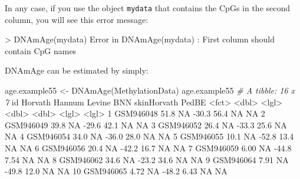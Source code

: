 \documentclass[]{article}
\newcommand{\hlnum}[1]{\textcolor[rgb]{0.816,0.125,0.439}{#1}}%
\newcommand{\hlstr}[1]{\textcolor[rgb]{0.251,0.627,0.251}{#1}}%
\newcommand{\hlcom}[1]{\textcolor[rgb]{0.502,0.502,0.502}{\textit{#1}}}%
\newcommand{\hlopt}[1]{\textcolor[rgb]{0,0,0}{#1}}%
\newcommand{\hlstd}[1]{\textcolor[rgb]{0.251,0.251,0.251}{#1}}%
\newcommand{\hlkwd}[1]{\textcolor[rgb]{0.878,0.439,0.125}{#1}}%
\newenvironment{Shaded}{\begin{myshaded}}{\end{myshaded}}
\renewenvironment{verbatim}{\color{codecolor}\begin{myshaded}\begin{oldverbatim}}{\end{oldverbatim}\end{myshaded}}
\newcommand{\KeywordTok}[1]{\hlkwd{#1}}
\newcommand{\DecValTok}[1]{\hlnum{#1}}
\newcommand{\FloatTok}[1]{\hlnum{#1}}
\newcommand{\StringTok}[1]{\hlstr{#1}}
\newcommand{\CommentTok}[1]{\hlcom{#1}}
\newcommand{\OtherTok}[1]{{#1}}
\newcommand{\OperatorTok}[1]{\hlopt{#1}}
\newcommand{\ErrorTok}[1]{\textcolor{errorcolor}{#1}}
\newcommand{\NormalTok}[1]{\hlstd{#1}}
\begin{document}
In any case, if you use the object \texttt{mydata} that contains the CpGs in the second column, you will see this error message:

\begin{verbatim}
> DNAmAge(mydata)
Error in DNAmAge(mydata) : First column should contain CpG names
\end{verbatim}

DNAmAge can be estimated by simply:

\begin{Shaded}
\begin{Highlighting}[]
\NormalTok{age.example55 <-}\StringTok{ }\KeywordTok{DNAmAge}\NormalTok{(MethylationData)}
\NormalTok{age.example55}
  \CommentTok{# A tibble: 16 x 7}
\NormalTok{     id        Horvath Hannum Levine   BNN skinHorvath PedBE}
     \OperatorTok{<}\NormalTok{fct}\OperatorTok{>}\StringTok{       }\ErrorTok{<}\NormalTok{dbl}\OperatorTok{>}\StringTok{ }\ErrorTok{<}\NormalTok{lgl}\OperatorTok{>}\StringTok{   }\ErrorTok{<}\NormalTok{dbl}\OperatorTok{>}\StringTok{ }\ErrorTok{<}\NormalTok{dbl}\OperatorTok{>}\StringTok{ }\ErrorTok{<}\NormalTok{lgl}\OperatorTok{>}\StringTok{       }\ErrorTok{<}\NormalTok{lgl}\OperatorTok{>}
\StringTok{   }\DecValTok{1}\NormalTok{ GSM946048   }\FloatTok{51.8}  \OtherTok{NA}      \FloatTok{-30.3} \FloatTok{56.4}  \OtherTok{NA}          \OtherTok{NA}   
   \DecValTok{2}\NormalTok{ GSM946049   }\FloatTok{39.8}  \OtherTok{NA}      \FloatTok{-29.6} \FloatTok{42.1}  \OtherTok{NA}          \OtherTok{NA}   
   \DecValTok{3}\NormalTok{ GSM946052   }\FloatTok{26.4}  \OtherTok{NA}      \FloatTok{-33.3} \FloatTok{25.6}  \OtherTok{NA}          \OtherTok{NA}   
   \DecValTok{4}\NormalTok{ GSM946054   }\FloatTok{34.0}  \OtherTok{NA}      \FloatTok{-36.0} \FloatTok{28.0}  \OtherTok{NA}          \OtherTok{NA}   
   \DecValTok{5}\NormalTok{ GSM946055   }\FloatTok{10.1}  \OtherTok{NA}      \FloatTok{-52.8} \FloatTok{13.4}  \OtherTok{NA}          \OtherTok{NA}   
   \DecValTok{6}\NormalTok{ GSM946056   }\FloatTok{20.4}  \OtherTok{NA}      \FloatTok{-42.2} \FloatTok{16.7}  \OtherTok{NA}          \OtherTok{NA}   
   \DecValTok{7}\NormalTok{ GSM946059    }\FloatTok{6.00} \OtherTok{NA}      \FloatTok{-44.8}  \FloatTok{7.54} \OtherTok{NA}          \OtherTok{NA}   
   \DecValTok{8}\NormalTok{ GSM946062   }\FloatTok{34.6}  \OtherTok{NA}      \FloatTok{-23.2} \FloatTok{34.6}  \OtherTok{NA}          \OtherTok{NA}   
   \DecValTok{9}\NormalTok{ GSM946064    }\FloatTok{7.91} \OtherTok{NA}      \FloatTok{-49.8} \FloatTok{12.0}  \OtherTok{NA}          \OtherTok{NA}   
  \DecValTok{10}\NormalTok{ GSM946065    }\FloatTok{4.72} \OtherTok{NA}      \FloatTok{-48.2}  \FloatTok{6.43} \OtherTok{NA}          \OtherTok{NA}   

\end{Highlighting}
\end{Shaded}
\end{document}
